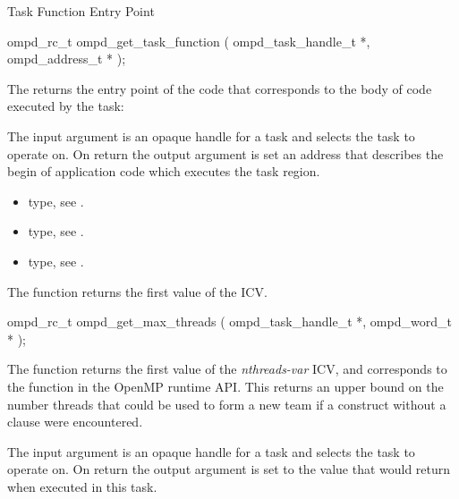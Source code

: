 \label{subsubsubsec:ompd_get_task_function}
\summary
Task Function Entry Point
\format
\begin{cspecific}
\begin{ompSyntax}
ompd_rc_t ompd_get_task_function (
  ompd_task_handle_t *,
  ompd_address_t *
);
\end{ompSyntax}
\end{cspecific}

\descr
The  returns the entry point of the code
that corresponds to the body of code executed by the task:

\argdesc
The input argument  is an opaque handle for a task and selects the task to operate on.
On return the output argument  is set an address that describes the begin of application
code which executes the task region.

\crossreferences
\begin{itemize}
  \item {} type, see .
	\item {} type, see .
	\item {} type, see .
\end{itemize}


\label{subsubsubsec:ompd_get_max_threads}
\summary
The  function returns the first value of the  ICV.

\format
\begin{cspecific}
\begin{ompSyntax}
ompd_rc_t ompd_get_max_threads (
  ompd_task_handle_t *,
  ompd_word_t *
);
\end{ompSyntax}
\end{cspecific}

\descr
The  function returns the first value of the
 \emph{nthreads-var} ICV,
and corresponds to the  function
in the OpenMP runtime API.
This returns an upper bound on the number threads that could be used
to form a new team if a  construct without a
 clause were encountered.

\argdesc
The input argument  is an opaque handle for a task and selects the task to operate on.
On return the output argument  is set to the value that  would return when
executed in this task.

